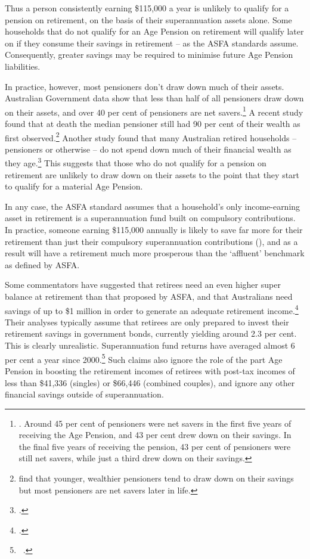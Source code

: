 Thus a person consistently earning \$115,000 a year is unlikely to qualify for a pension on retirement, on the basis of their superannuation assets alone. Some households that do not qualify for an Age Pension on retirement will qualify later on if they consume their savings in retirement – as the ASFA standards assume. Consequently, greater savings may be required to minimise future Age Pension liabilities.

In practice, however, most pensioners don’t draw down much of their assets. Australian Government data show that less than half of all pensioners draw down on their assets, and over 40 per cent of pensioners are net savers.\footnote{\textcite{Morrison2015TheBestFormOfWelfare}. Around 45 per cent of pensioners were net savers in the first five years of receiving the Age Pension, and 43 per cent drew down on their savings. In the final five years of receiving the pension, 43 per cent of pensioners were still net savers, while just a third drew down on their savings.}  
A recent study found that at death the median pensioner still had 90 per cent of their wealth as first observed.\footnote{\textcite{WuAsherMeyrickeEtAl2015} find that younger, wealthier pensioners tend to draw down on their savings but most pensioners are net savers later in life.} Another study found that many Australian retired households – pensioners or otherwise – do not spend down much of their financial wealth as they age.\footcite{SpicerStavrunovaThorp2015} This suggests that those who do not qualify for a pension on retirement are unlikely to draw down on their assets to the point that they start to qualify for a material Age Pension. 

In any case, the ASFA standard assumes that a household’s only income-earning asset in retirement is a superannuation fund built on compulsory contributions. In practice, someone earning \$115,000 annually is likely to save far more for their retirement than just their compulsory superannuation contributions (), and as a result will have a retirement much more prosperous than the ‘affluent’ benchmark as defined by ASFA. 

Some commentators have suggested that retirees need an even higher super balance at retirement than that proposed by ASFA, and that Australians need savings of up to \$1 million in order to generate an adequate retirement income.\footcite{Cooper2015}  Their analyses typically assume that retirees are only prepared to invest their retirement savings in government bonds, currently yielding around 2.3 per cent. This is clearly unrealistic. Superannuation fund returns have averaged almost 6 per cent a year since 2000.\footnote{\gao\ \textcite{APRA2015JuneSuperPerformance}.} 
Such claims also ignore the role of the part Age Pension in boosting the retirement incomes of retirees with post-tax incomes of less than \$41,336 (singles) or \$66,446 (combined couples), and ignore any other financial savings outside of superannuation. 

